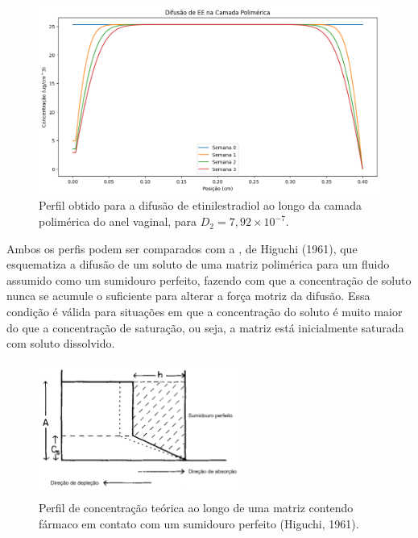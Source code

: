\begin{figure}[!htb]
    \centering
        \includegraphics[width=1\textwidth]{figuras/difusao_anel.png}
        \caption[Difusão de etinilestradiol ao longo da camada polimérica do anel]{Perfil obtido para a difusão de etinilestradiol ao longo da camada polimérica do anel vaginal, para $D_2 = 7,92 \times 10^{-7}$.}
    \label{fig:difusao_anel}
\end{figure}

Ambos os perfis podem ser comparados com a , de Higuchi (1961), que esquematiza a difusão de um soluto de uma matriz polimérica para um fluido assumido como um sumidouro perfeito, fazendo com que a concentração de soluto nunca se acumule o suficiente para alterar a força motriz da difusão. Essa condição é válida para situações em que a concentração do soluto é muito maior do que a concentração de saturação, ou seja, a matriz está inicialmente saturada com soluto dissolvido. 

\begin{figure}[!htb]
    \centering
        \includegraphics[width=0.6\textwidth]{figuras/Higuchi1961.png}
        \caption[Perfil de concentração teórica de uma matriz contendo fármaco em contato com um sumidouro perfeito]{Perfil de concentração teórica ao longo de uma matriz contendo fármaco em contato com um sumidouro perfeito (Higuchi, 1961).}
    \label{fig:Higuchi1961}
\end{figure}

